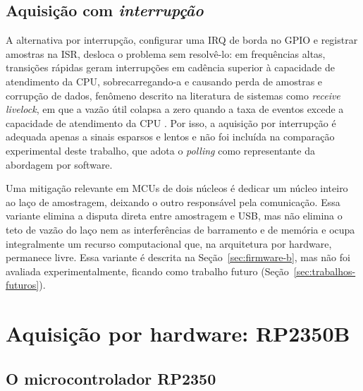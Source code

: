 \subsection{Aquisição com \emph{interrupção}}\label{sec:interrupt}

A alternativa por interrupção, configurar uma \ac{IRQ} de borda no \ac{GPIO} e
registrar amostras na \ac{ISR}, desloca o problema sem resolvê-lo: em
frequências altas, transições rápidas geram interrupções em cadência superior à
capacidade de atendimento da \ac{CPU}, sobrecarregando-a e causando perda de
amostras e corrupção de dados, fenômeno descrito na literatura de sistemas como
\emph{receive livelock}, em que a vazão útil colapsa a zero quando a taxa de
eventos excede a capacidade de atendimento da \ac{CPU}
\cite{mogul1997,regehr2005,souza2020}. Por isso, a aquisição por interrupção é
adequada apenas a sinais esparsos e lentos e não foi incluída na comparação
experimental deste trabalho, que adota o \emph{polling} como representante da
abordagem por software.

Uma mitigação relevante em \acp{MCU} de dois núcleos é dedicar um núcleo
inteiro ao laço de amostragem, deixando o outro responsável pela comunicação.
Essa variante elimina a disputa direta entre amostragem e \ac{USB}, mas não
elimina o teto de vazão do laço nem as interferências de barramento e de
memória e ocupa integralmente um recurso computacional que, na arquitetura por
hardware, permanece livre. Essa variante é descrita na
Seção~\ref{sec:firmware-b}, mas não foi avaliada experimentalmente, ficando
como trabalho futuro (Seção~\ref{sec:trabalhos-futuros}).

\section{Aquisição por hardware: RP2350B}\label{sec:hardware}

\subsection{O microcontrolador RP2350}

